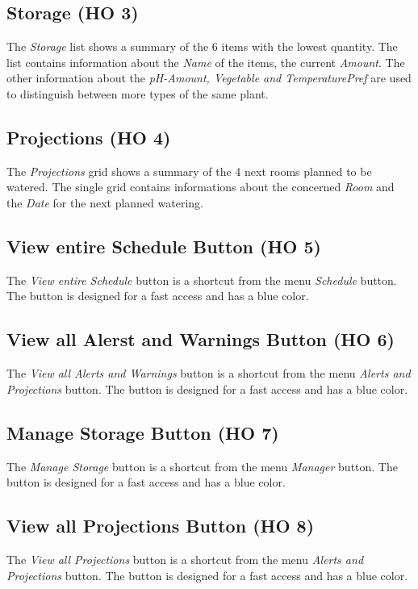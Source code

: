\subsection{Storage (HO 3)}
The \emph{Storage} list shows a summary of the 6 items with the lowest quantity.
The list contains information about the \emph{Name} of the items, the current
\emph{Amount}. The other information about the \emph{pH-Amount, Vegetable and
TemperaturePref} are used to distinguish between more types of the same plant.

\subsection{Projections (HO 4)}
The \emph{Projections} grid shows a summary of the 4 next rooms planned
to be watered. The single grid contains informations about the concerned
\emph{Room} and the \emph{Date} for the next planned watering.

\subsection{View entire Schedule Button (HO 5)}
The \emph{View entire Schedule} button is a shortcut from the menu
\emph{Schedule} button. The button is designed for a fast access and has a blue
color.

\subsection{View all Alerst and Warnings Button (HO 6)}
The \emph{View all Alerts and Warnings} button is a shortcut from the menu
\emph{Alerts and Projections} button. The button is designed for a fast access
and has a blue color.

\subsection{Manage Storage Button (HO 7)}
The \emph{Manage Storage} button is a shortcut from the menu
\emph{Manager} button. The button is designed for a fast access and has a blue
color.

\subsection{View all Projections Button (HO 8)}
The \emph{View all Projections} button is a shortcut from the menu
\emph{Alerts and Projections} button. The button is designed for a fast access
and has a blue color.

